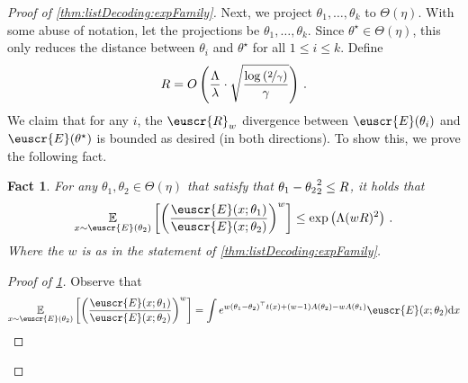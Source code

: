 \documentclass[11pt]{article}
\theoremstyle{plain}
\newtheorem{fact}[theorem]{Fact}
\theoremstyle{definition}
\theoremstyle{remark}
\newcommand{\inparen}[1]{\left(#1\right)}
\newcommand{\insquare}[1]{\left[#1\right]}
\let\norm\relax
\newcommand{\norm}[1]{\ensuremath{\left\lVert #1 \right\rVert}}
\newcommand{\E}{\operatornamewithlimits{\mathbb{E}}}
\newcommand{\Ex}{\E}
\newcommand{\nfrac}[2]{\nicefrac{#1}{#2}}
\newcommand{\customcal}[1]{\euscr{#1}}
\newcommand{\cE}{\customcal{E}}
\newcommand{\cR}{\customcal{R}}
\renewcommand{\d}{{\rm d}}
\begin{document}
\begin{proof}[Proof of \cref{thm:listDecoding:expFamily}]
                \noindent Next, we project $\theta_1,\dots,\theta_k$ to $\Theta(\eta)$.
                With some abuse of notation, let the projections be $\theta_1,\dots,\theta_k$.
                Since $\theta^\star\in \Theta(\eta)$, this only reduces the distance between $\theta_i$ and $\theta^\star$ for all $1\leq i\leq k$.
                Define 
                \[
                    R = O\inparen{
                            {\frac{\Lambda}{\lambda}}
                            \cdot
                            \sqrt{
                                \frac{\log\inparen{\nfrac{2}{\gamma}}}{\gamma}
                            }
                        }
                    \,.
                \]
                We claim that for any $i$, the $\cR_{w}$ divergence between $\cE(\theta_i)$ and $\cE(\theta^\star)$ is bounded as desired (in both directions).
                To show this, we prove the following fact. 
                    \begin{fact}\label{fact:app}
                        For any $\theta_1,\theta_2\in \Theta(\eta)$ that satisfy that $\norm{\theta_1-\theta_2}_2^2\leq R$, it holds that 
                        \[
                            \Ex_{x\sim \cE(\theta_2)}\insquare{
                            \inparen{
                                \frac{
                                    \cE(x; \theta_1)
                                }{
                                    \cE(x; \theta_2)
                                }
                            }^{w}
                            }
                            \leq \exp\inparen{
                                \Lambda ({w}R)^2 
                            }\,.
                        \]
                        Where the ${w}$ is as in the statement of \cref{thm:listDecoding:expFamily}.
                    \end{fact}
                    \begin{proof}[Proof of \cref{fact:app}]
                        Observe that 
                        \begin{align*}
                            \Ex_{x\sim \cE(\theta_2)}\insquare{
                                \inparen{
                                    \frac{
                                        \cE(x; \theta_1)
                                    }{
                                        \cE(x; \theta_2)
                                    }
                                }^{w}
                            }
                            &=
                            \int  e^{{w}(\theta_1-\theta_2)^\top t(x) + ({w}-1)A(\theta_2)-{w}A(\theta_1)} \cE(x; \theta_2)\d x\\

\end{align*}
\end{proof}
\end{proof}
\end{document}
